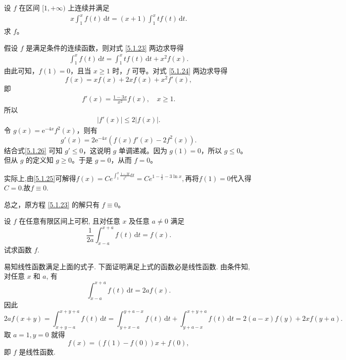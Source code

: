 \documentclass[../../main.tex]{subfiles}
\begin{document}
\begin{example}
设 \( f \) 在区间 \([1,+\infty)\) 上连续并满足
\begin{align}
x \int_{1}^{x} f(t) \, \mathrm{d}t = (x + 1) \int_{1}^{x} t f(t) \, \mathrm{d}t. \label{5.1.23}
\end{align}
求 \( f \)。
\end{example}
\begin{solution}
假设 \( f \) 是满足条件的连续函数，则对式 \eqref{5.1.23}  两边求导得
\begin{align}
\int_{1}^{x} f(t) \, \mathrm{d}t = \int_{1}^{x} t f(t) \, \mathrm{d}t + x^2 f(x). \label{5.1.24}
\end{align}
由此可知，\( f(1) = 0 \)，且当 \( x \geq 1 \) 时，\( f \) 可导。对式 \eqref{5.1.24} 两边求导得
\[
f(x) = x f(x) + 2x f(x) + x^2 f'(x),
\]
即
\begin{align}
f'(x) = \frac{1 - 3x}{x^2} f(x), \quad x \geq 1. \label{5.1.25}
\end{align}
所以
\begin{align}
|f'(x)| \leq 2 |f(x)|. \label{5.1.26}
\end{align}
令 \( g(x) = \mathrm{e}^{-4x} f^2(x) \)，则有
\[
g'(x) = 2 \mathrm{e}^{-4x} \left( f(x) f'(x) - 2 f^2(x) \right).
\]
结合式\eqref{5.1.26} 可知 \( g' \leq 0 \)，这说明 \( g \) 单调递减。因为 \( g(1) = 0 \)，所以 \( g \leq 0 \)。但从 \( g \) 的定义知 \( g \geq 0 \)。于是 \( g = 0 \)，从而 \( f = 0 \)。

实际上,由\eqref{5.1.25}可解得$f\left( x \right) =Ce^{\int_1^x{\frac{1-3t}{t^2}\mathrm{d}t}}=Ce^{1-\frac{1}{x}-3\ln x},$再将$f(1)=0$代入得$C=0.$故$f\equiv 0.$

总之，原方程 \eqref{5.1.23} 的解只有 \( f \equiv 0 \)。

\end{solution}

\begin{example}
设 \( f \) 在任意有限区间上可积, 且对任意 \( x \) 及任意 \( a \neq 0 \) 满足
\[
\frac{1}{2a} \int_{x - a}^{x + a} f(t) \, \mathrm{d}t = f(x).
\]
试求函数 \( f \).
\end{example}
\begin{solution}
易知线性函数满足上面的式子. 下面证明满足上式的函数必是线性函数. 由条件知, 对任意 \( x \) 和 \( a \), 有
\[
\int_{x - a}^{x + a} f(t) \, \mathrm{d}t = 2a f(x).
\]
因此
\[
2a f(x + y) = \int_{x + y - a}^{x + y + a} f(t) \, \mathrm{d}t = \int_{y + x - a}^{y + a - x} f(t) \, \mathrm{d}t + \int_{y + a - x}^{x + y + a} f(t) \, \mathrm{d}t
= 2(a - x) f(y) + 2x f(y + a).
\]
取 \( a = 1, y = 0 \) 就得
\[
f(x) = (f(1) - f(0))x + f(0),
\]
即 \( f \) 是线性函数.

\end{solution}
\end{document}
